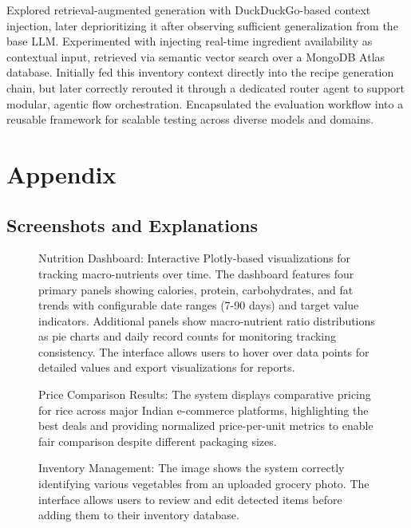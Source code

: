 \documentclass{ecai}
\begin{document}
Explored retrieval-augmented generation with DuckDuckGo-based context injection, later deprioritizing it after observing sufficient generalization from the base LLM. Experimented with injecting real-time ingredient availability as contextual input, retrieved via semantic vector search over a MongoDB Atlas database. Initially fed this inventory context directly into the recipe generation chain, but later correctly rerouted it through a dedicated router agent to support modular, agentic flow orchestration. Encapsulated the evaluation workflow into a reusable framework for scalable testing across diverse models and domains.

\clearpage
\section*{Appendix}

\subsection*{Screenshots and Explanations}

\begin{figure}[h]
\centering
{}
\caption{Nutrition Dashboard: Interactive Plotly-based visualizations for tracking macro-nutrients over time. The dashboard features four primary panels showing calories, protein, carbohydrates, and fat trends with configurable date ranges (7-90 days) and target value indicators. Additional panels show macro-nutrient ratio distributions as pie charts and daily record counts for monitoring tracking consistency. The interface allows users to hover over data points for detailed values and export visualizations for reports.}
\end{figure}

\begin{figure}[h]
\centering
{}
\caption{Price Comparison Results: The system displays comparative pricing for rice across major Indian e-commerce platforms, highlighting the best deals and providing normalized price-per-unit metrics to enable fair comparison despite different packaging sizes.}
\end{figure}

\begin{figure}[h]
\centering
{}
\caption{Inventory Management: The image shows the system correctly identifying various vegetables from an uploaded grocery photo. The interface allows users to review and edit detected items before adding them to their inventory database.}
\end{figure}
\end{document}
